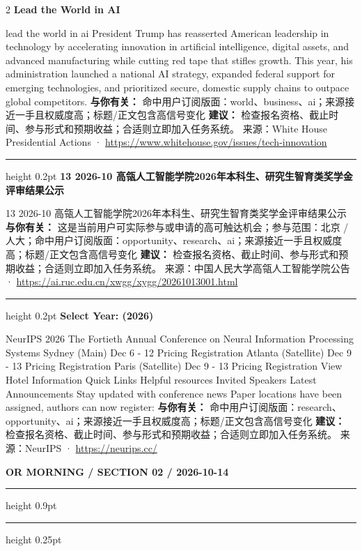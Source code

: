 \documentclass[10.5pt]{ctexart}
\begin{document}
\begin{multicols}{2}
{\large\bfseries Lead the World in AI}\par
lead the world in ai President Trump has reasserted American leadership in technology by accelerating innovation in artificial intelligence, digital assets, and advanced manufacturing while cutting red tape that stifles growth. This year, his administration launched a national AI strategy, expanded federal support for emerging technologies, and prioritized secure, domestic supply chains to outpace global competitors.
\textbf{与你有关：} 命中用户订阅版面：world、business、ai；来源接近一手且权威度高；标题/正文包含高信号变化
\textbf{建议：} 检查报名资格、截止时间、参与形式和预期收益；合适则立即加入任务系统。
{\footnotesize\color{ormuted} 来源：White House Presidential Actions · \url{https://www.whitehouse.gov/issues/tech-innovation}}
\vspace{2mm}
\hrule height 0.2pt
\vspace{2mm}
{\large\bfseries 13 2026-10 高瓴人工智能学院2026年本科生、研究生智育类奖学金评审结果公示}\par
13 2026-10 高瓴人工智能学院2026年本科生、研究生智育类奖学金评审结果公示
\textbf{与你有关：} 这是当前用户可实际参与或申请的高可触达机会；参与范围：北京 / 人大；命中用户订阅版面：opportunity、research、ai；来源接近一手且权威度高；标题/正文包含高信号变化
\textbf{建议：} 检查报名资格、截止时间、参与形式和预期收益；合适则立即加入任务系统。
{\footnotesize\color{ormuted} 来源：中国人民大学高瓴人工智能学院公告 · \url{https://ai.ruc.edu.cn/xwgg/xygg/20261013001.html}}
\vspace{2mm}
\hrule height 0.2pt
\vspace{2mm}
{\large\bfseries Select Year: (2026)}\par
NeurIPS 2026 The Fortieth Annual Conference on Neural Information Processing Systems Sydney (Main) Dec 6 - 12 Pricing Registration Atlanta (Satellite) Dec 9 - 13 Pricing Registration Paris (Satellite) Dec 9 - 13 Pricing Registration View Hotel Information Quick Links Helpful resources Invited Speakers Latest Announcements Stay updated with conference news Paper locations have been assigned, authors can now register: 
\textbf{与你有关：} 命中用户订阅版面：research、opportunity、ai；来源接近一手且权威度高；标题/正文包含高信号变化
\textbf{建议：} 检查报名资格、截止时间、参与形式和预期收益；合适则立即加入任务系统。
{\footnotesize\color{ormuted} 来源：NeurIPS · \url{https://neurips.cc/}}
\end{multicols}
\newpage
{\small\bfseries OR MORNING / SECTION 02 / 2026-10-14}
\vspace{2mm}
\hrule height 0.9pt
\vspace{1.5mm}
\hrule height 0.25pt
\vspace{4mm}
\end{document}
